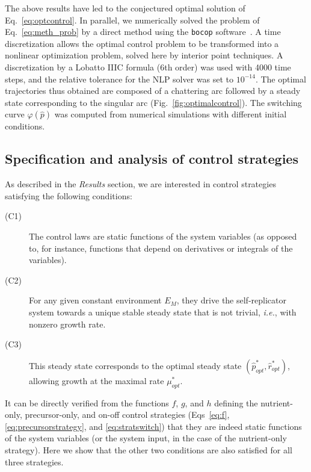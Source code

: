 \documentclass[10pt,letterpaper]{article}
\begin{document}
{The above results have led to the conjectured optimal solution of Eq.~\ref{eq:optcontrol}.
In parallel, we numerically solved the problem of Eq.~\ref{eq:meth_prob} by a direct method using the \texttt{bocop} software~\cite{bonnans_bocop_2012}.
A time discretization allows the optimal control problem to be transformed into a nonlinear optimization problem,
solved here by interior point techniques.
A discretization by a Lobatto IIIC formula (6th order) was used with 4000 time steps, and the relative tolerance for the NLP solver was set to $10^{-14}$.
The optimal trajectories thus obtained are composed of a chattering arc followed by a steady state corresponding to the singular arc (Fig.~\ref{fig:optimalcontrol}).
The switching curve $\varphi(\hat{p})$ was computed from numerical simulations with different initial conditions. 

\subsection*{Specification and analysis of control strategies}

As described in the \textit{Results} section, we are interested in control strategies satisfying the following conditions:
\begin{description}
\item[(C1)] The control laws are static functions of the system variables (as opposed to, for instance, functions that depend on derivatives or integrals of the variables).
\item[(C2)] For any given constant environment $E_M$, they drive the self-replicator system towards a unique stable steady state that is not trivial, \textit{i.e.}, with nonzero growth rate.
\item[(C3)] This steady state corresponds to the optimal steady state $(\hat{p}_{opt}^*, \hat{r}_{opt}^*)$, allowing growth at the maximal rate $\mu^*_{opt}$.
\end{description}
It can be directly verified from the functions $f$, $g$, and $h$ defining the nutrient-only, precursor-only, and on-off control strategies (Eqs~\ref{eq:f}, \ref{eq:precursorstrategy}, and \ref{eq:stratswitch}) that they are indeed static functions of the system variables (or the system input, in the case of the nutrient-only strategy). 
Here we show that the other two conditions are also satisfied for all three strategies.

}
\end{document}

